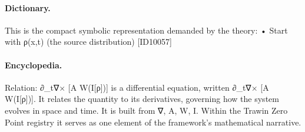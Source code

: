 \paragraph{Dictionary.}
This is the compact symbolic representation demanded by the theory: • Start with ρ(x,t) (the source distribution) [ID10057]

\paragraph{Encyclopedia.}
Relation: ∂\_t∇× [A W(I[ρ])] is a differential equation, written ∂\_t∇× [A W(I[ρ])]. It relates the quantity to its derivatives, governing how the system evolves in space and time. It is built from ∇, A, W, I. Within the Trawin Zero Point registry it serves as one element of the framework's mathematical narrative.

